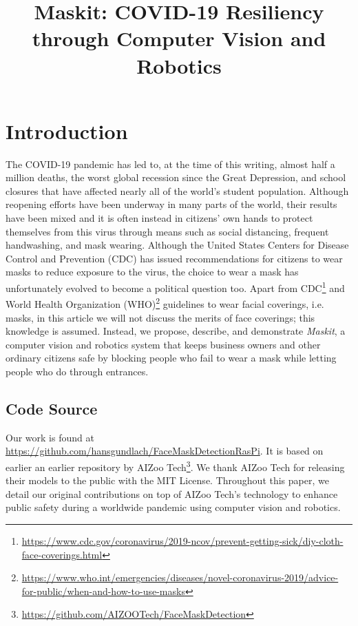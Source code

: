 \documentclass[conference, 12pt, onecolumn]{IEEEtran}
\date{}
\begin{document}
\title{Maskit: COVID-19 Resiliency through Computer Vision and Robotics}
\author{ 
\and
{}
}

\maketitle
\thispagestyle{plain}
\pagestyle{plain}
\tableofcontents
\newpage

\section{Introduction}
The COVID-19 pandemic has led to, at the time of this writing, almost half a million deaths\cite{fink2020worst}, the worst global recession since the Great Depression\cite{fernandes2020economic}, and school closures that have affected nearly all of the world's student population\cite{viner2020school}. Although reopening efforts have been underway in many parts of the world, their results have been mixed and it is often instead in citizens' own hands to protect themselves from this virus through means such as social distancing, frequent handwashing, and mask wearing. Although the United States Centers for Disease Control and Prevention (CDC) has issued recommendations for citizens to wear masks to reduce exposure to the virus, the choice to wear a mask has unfortunately evolved to become a political question too\cite{brandon_2020, vigdor_2020}. Apart from CDC\footnote{\url{https://www.cdc.gov/coronavirus/2019-ncov/prevent-getting-sick/diy-cloth-face-coverings.html}} and World Health Organization (WHO)\footnote{\url{https://www.who.int/emergencies/diseases/novel-coronavirus-2019/advice-for-public/when-and-how-to-use-masks}} guidelines to wear facial coverings, i.e. masks, in this article we will not discuss the merits of face coverings; this knowledge is assumed. Instead, we propose, describe, and demonstrate \textit{Maskit}, a computer vision and robotics system that keeps business owners and other ordinary citizens safe by blocking people who fail to wear a mask while letting people who do through entrances.
\subsection{Code Source}
Our work is found at \url{https://github.com/hansgundlach/FaceMaskDetectionRasPi}. It is based on earlier an earlier repository by AIZoo Tech\footnote{\url{https://github.com/AIZOOTech/FaceMaskDetection}}. We thank AIZoo Tech for releasing their models to the public with the MIT License. Throughout this paper, we detail our original contributions on top of AIZoo Tech's technology to enhance public safety during a worldwide pandemic using computer vision and robotics.
\end{document}
